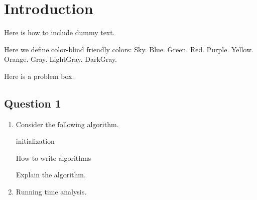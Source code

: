 \section{Introduction}

Here is how to include dummy text.
\lipsum[1]

Here we define color-blind friendly colors:
\textcolor{kSky}{Sky.}
\textcolor{kBlue}{Blue.}
\textcolor{kGreen}{Green.}
\textcolor{kRed}{Red.}
\textcolor{kPurple}{Purple.}
\textcolor{kYellow}{Yellow.}
\textcolor{kOrange}{Orange.}
\textcolor{kGray}{Gray.}
\textcolor{kLightGray}{LightGray.}
\textcolor{kDarkGray}{DarkGray.}

Here is a problem box.


\subsection{Question 1}

\begin{enumerate}[label=(\alph*)]
  \item Consider the following algorithm.

  \begin{minipage}{\linewidth}
    \begin{algorithm}[H]
      \SetAlgoLined
      initialization\;
      \caption{How to write algorithms}
    \end{algorithm}
  \end{minipage}

Explain the algorithm.

  \item Running time analysis.
\end{enumerate}

